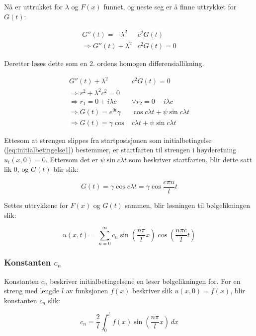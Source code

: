 Nå er uttrukket for $\lambda$ og $F(x)$ funnet, og neste seg er å finne uttrykket for $G(t)$:

\begin{align*}
	G''(t) = - \lambda^2 & c^2 G(t) \\
	\Rightarrow G''(t) + \lambda^2 & c^2 G(t) = 0 
\end{align*}

Deretter løses dette som en 2. ordens homogen differensiallikning.

\begin{align*}
	G''(t) + \lambda^2 & c^2 G(t) = 0 \\
	\Rightarrow r^2 + \lambda^2 c^2 = 0 \\
	\Rightarrow r_1 = 0 + i \lambda c &\vee r_2 = 0 - i \lambda c \\ 
	\Rightarrow G(t) = e^{0 t} \gamma&\cos c \lambda t + \psi \sin c \lambda t \\
	\Rightarrow G(t) = \gamma\cos & c \lambda t + \psi \sin c \lambda t
\end{align*}

Ettesom at strengen slippes fra startposisjonen som initialbetingelse (\ref{eq:initialbetingelse1})
bestemmer, er startfarten til strengen i høyderetning $u_t(x,0) = 0$. Ettersom det er $ \psi \sin c \lambda t $
som beskriver startfarten, blir dette satt lik $0$, og $G(t)$ blir slik:

\begin{equation*}
	G(t) = \gamma \cos c \lambda t = \gamma \cos \frac{c \pi n}{l} t
\end{equation*}

Settes uttrykkene for $F(x)$ og $G(t)$ sammen, blir løsningen til bølgelikningen slik:

\begin{equation}
	u(x,t) = \sum_{n=0}^{\infty} c_n 
	\sin \left( \frac{n \pi}{l} x \right)
	\cos \left( \frac{n \pi c}{l} t \right)
	\label{eq:bølgelikningLøst}	
\end{equation}

\subsubsection{Konstanten \texorpdfstring{$c_n$}{cn}}

Konstanten $c_n$ beskriver initialbetingelsene en løser bølgelikningen for. For en streng med lengde
$l$ av funksjonen $f(x)$ beskriver slik $u(x,0) = f(x)$, blir konstanten $c_n$ slik:

\begin{equation}
	c_n = \frac{2}{l} \int_{0}^{l} f(x) \sin \left( \frac{n \pi}{l} x \right) \,dx
	\label{eq:cnDefinisjon}
\end{equation}

